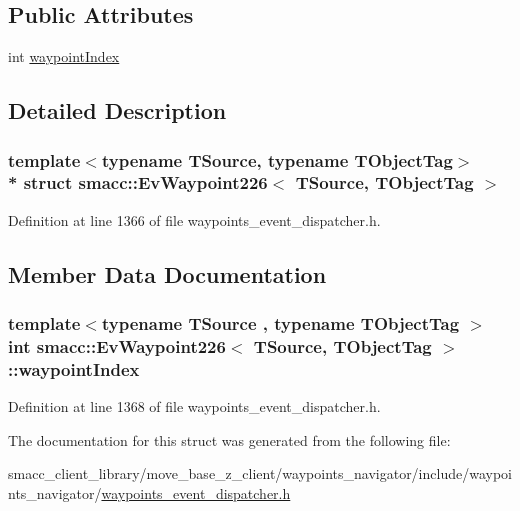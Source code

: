 \subsection*{Public Attributes}
\begin{DoxyCompactItemize}
\item 
int \hyperlink{structsmacc_1_1EvWaypoint226_a68f0106058aa9cd8bc304cbd97a36fc0}{waypoint\+Index}
\end{DoxyCompactItemize}


\subsection{Detailed Description}
\subsubsection*{template$<$typename T\+Source, typename T\+Object\+Tag$>$\\*
struct smacc\+::\+Ev\+Waypoint226$<$ T\+Source, T\+Object\+Tag $>$}



Definition at line 1366 of file waypoints\+\_\+event\+\_\+dispatcher.\+h.



\subsection{Member Data Documentation}
\subsubsection[{\texorpdfstring{waypoint\+Index}{waypointIndex}}]{\setlength{\rightskip}{0pt plus 5cm}template$<$typename T\+Source , typename T\+Object\+Tag $>$ int {\bf smacc\+::\+Ev\+Waypoint226}$<$ T\+Source, T\+Object\+Tag $>$\+::waypoint\+Index}\hypertarget{structsmacc_1_1EvWaypoint226_a68f0106058aa9cd8bc304cbd97a36fc0}{}\label{structsmacc_1_1EvWaypoint226_a68f0106058aa9cd8bc304cbd97a36fc0}


Definition at line 1368 of file waypoints\+\_\+event\+\_\+dispatcher.\+h.



The documentation for this struct was generated from the following file\+:\begin{DoxyCompactItemize}
\item 
smacc\+\_\+client\+\_\+library/move\+\_\+base\+\_\+z\+\_\+client/waypoints\+\_\+navigator/include/waypoints\+\_\+navigator/\hyperlink{waypoints__event__dispatcher_8h}{waypoints\+\_\+event\+\_\+dispatcher.\+h}\end{DoxyCompactItemize}
